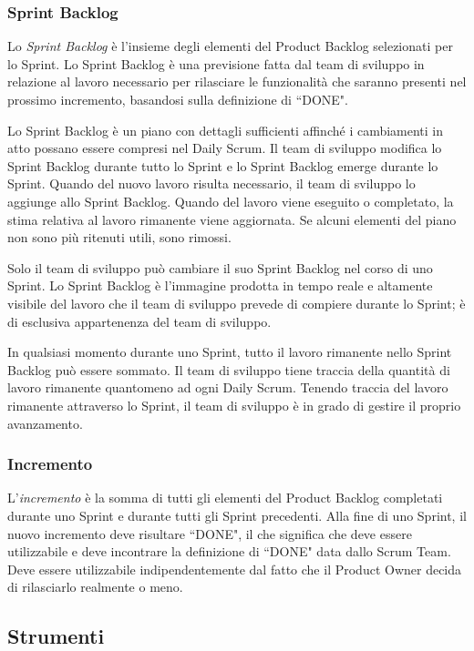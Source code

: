 \documentclass{article}
\begin{document}
\subsubsection{Sprint Backlog}
Lo \textit{Sprint Backlog} è l'insieme degli elementi del Product Backlog selezionati per lo Sprint. 
Lo Sprint Backlog è una previsione fatta dal team di sviluppo in relazione al lavoro necessario 
per rilasciare le funzionalità che saranno presenti nel prossimo incremento, basandosi sulla 
definizione di ``DONE".

Lo Sprint Backlog è un piano con dettagli sufficienti affinché i cambiamenti in atto possano 
essere compresi nel Daily Scrum. Il team di sviluppo modifica lo Sprint Backlog durante
tutto lo Sprint e lo Sprint Backlog emerge durante lo Sprint. 
Quando del nuovo lavoro risulta necessario, il team di sviluppo lo aggiunge allo Sprint Backlog. 
Quando del lavoro viene eseguito o completato, la stima relativa al lavoro rimanente viene aggiornata. 
Se alcuni elementi del piano non sono più ritenuti utili, sono rimossi. 

Solo il team di sviluppo può cambiare il suo Sprint Backlog nel corso di uno Sprint. 
Lo Sprint Backlog è l'immagine prodotta in tempo reale e altamente visibile del lavoro che il team 
di sviluppo prevede di compiere durante lo Sprint; è di esclusiva appartenenza del team di sviluppo.

In qualsiasi momento durante uno Sprint, tutto il lavoro rimanente nello Sprint Backlog può essere
sommato. Il team di sviluppo tiene traccia della quantità di lavoro rimanente quantomeno ad ogni Daily
Scrum. Tenendo traccia del lavoro rimanente attraverso lo Sprint, il team di sviluppo è in grado di
gestire il proprio avanzamento.

\subsubsection{Incremento}
L'\textit{incremento} è la somma di tutti gli elementi del Product Backlog completati durante uno Sprint e
durante tutti gli Sprint precedenti. Alla fine di uno Sprint, il nuovo incremento deve risultare ``DONE", 
il che significa che deve essere utilizzabile e deve incontrare la definizione di ``DONE" data dallo Scrum
Team. Deve essere utilizzabile indipendentemente dal fatto che il Product Owner decida di rilasciarlo
realmente o meno.


\subsection{Strumenti}
\end{document}
